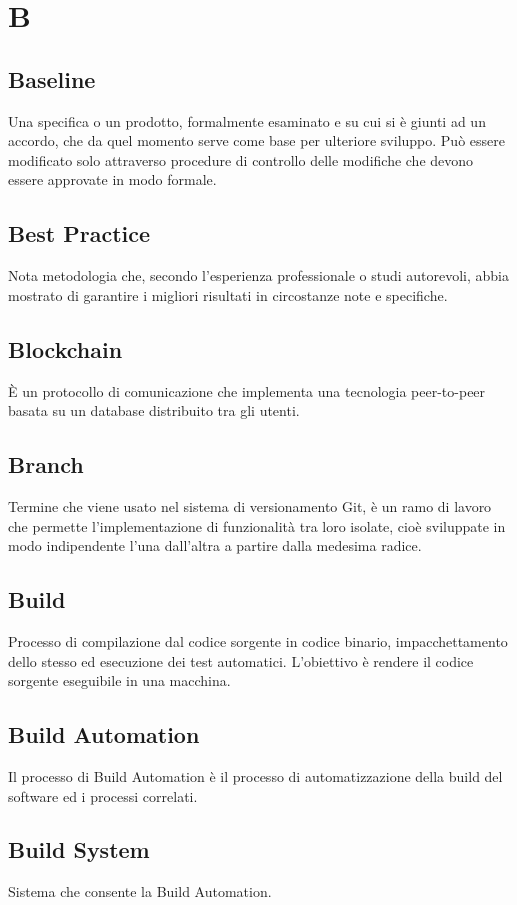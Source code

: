 \section*{B}

\subsection{Baseline}
Una specifica o un prodotto, formalmente esaminato e su cui si è giunti ad un accordo, che da quel momento serve come base per ulteriore sviluppo. Può essere modificato solo attraverso procedure di controllo delle modifiche che devono essere approvate in modo formale.

\subsection{Best Practice}
Nota metodologia che, secondo l'esperienza professionale o studi autorevoli, abbia mostrato di garantire i migliori risultati in circostanze note e specifiche.

\subsection{Blockchain}
È un protocollo di comunicazione che implementa una tecnologia peer-to-peer basata su un database distribuito tra gli utenti.

\subsection{Branch}
Termine che viene usato nel sistema di versionamento Git, è un ramo di lavoro che permette l'implementazione di funzionalità tra loro isolate, cioè sviluppate in modo indipendente l'una dall'altra a partire dalla medesima radice.

\subsection{Build}
Processo di compilazione dal codice sorgente in codice binario, impacchettamento dello stesso ed esecuzione dei test automatici. L'obiettivo è rendere il codice sorgente eseguibile in una macchina.

\subsection{Build Automation}
Il processo di Build Automation è il processo di automatizzazione della build del software ed i processi correlati.  

\subsection{Build System}
Sistema che consente la Build Automation.